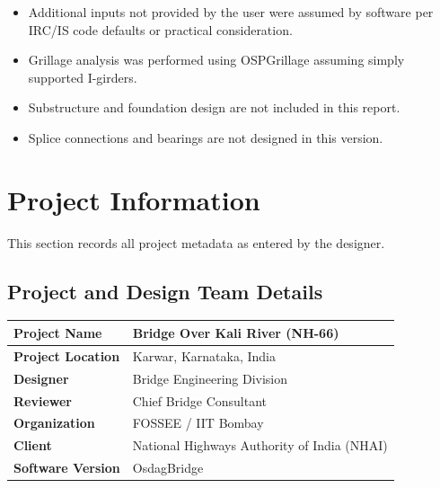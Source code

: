 \documentclass[12pt,a4paper]{report}
\numberwithin{table}{chapter}
\numberwithin{figure}{chapter}
\begin{document}
\begin{itemize}
\item Additional inputs not provided by the user were assumed by software per IRC/IS code defaults or practical consideration.
\item Grillage analysis was performed using OSPGrillage assuming simply supported I-girders.
\item Substructure and foundation design are not included in this report.
\item Splice connections and bearings are not designed in this version.
\end{itemize}

\titleformat{\chapter}[block]{\normalfont\Large\bfseries\centering}{\thechapter}{1em}{}
\titlespacing*{\chapter}{0pt}{-30pt}{10pt}


\chapter{Project Information}

This section records all project metadata as entered by the designer.

\section{Project and Design Team Details}
\label{sec:project-details}

\begin{tabular}{|L{5.5cm}|L{8.5cm}|}
\hline
\textbf{Project Name} & Bridge Over Kali River (NH-66) \\
\hline
\textbf{Project Location} & Karwar, Karnataka, India \\
\hline
\textbf{Designer} & Bridge Engineering Division \\
\hline
\textbf{Reviewer} & Chief Bridge Consultant \\
\hline
\textbf{Organization} & FOSSEE / IIT Bombay \\
\hline
\textbf{Client} & National Highways Authority of India (NHAI) \\
\hline
\textbf{Software Version} & OsdagBridge \\
\hline
\end{tabular}
\end{document}
